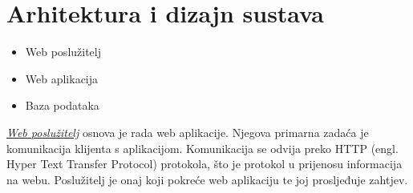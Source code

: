 \chapter{Arhitektura i dizajn sustava} \label{arhitektura}
		
		




		
	\begin{itemize}
		\item{Web poslužitelj}
		\item{Web aplikacija}
		\item{Baza podataka}		
	\end{itemize}
	
	\underline{\textit{Web poslužitelj}} osnova je rada web aplikacije. Njegova primarna zadaća je komunikacija klijenta s aplikacijom. Komunikacija se odvija preko HTTP (engl. Hyper Text Transfer Protocol) protokola, što je protokol u prijenosu informacija na webu. Poslužitelj je onaj koji pokreće web aplikaciju te joj prosljeđuje zahtjev.
	
